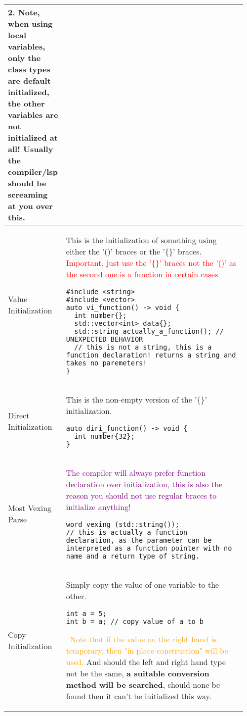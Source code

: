 \documentclass[main.tex,fontsize=8pt,paper=a4,paper=portrait,DIV=calc]{scrartcl}
\begin{document}
\begin{table}[ht!]
\begin{tabular}{|m{0.2\linewidth}|m{0.755\linewidth}|}
\textbf{2. Note, when using local variables, only the class types are default initialized, the other variables are not initialized at all! Usually the compiler/lsp should be screaming at you over this.}
\\
\hline
Value Initialization & 
This is the initialization of something using either the '()' braces or the '\{\}' braces.\newline
\textcolor{red}{Important, just use the '\{\}' braces not the '()' as the second one is a function in certain cases}
\begin{lstlisting}
#include <string>
#include <vector>
auto vi_function() -> void {
  int number{};
  std::vector<int> data{};
  std::string actually_a_function(); // UNEXPECTED BEHAVIOR
  // this is not a string, this is a function declaration! returns a string and takes no paremeters!
}
\end{lstlisting}
\\
\hline
Direct Initialization & 
This is the non-empty version of the '\{\}' initialization.\newline
\begin{lstlisting}
auto diri_function() -> void {
  int number{32};
}
\end{lstlisting}
\\
\hline
Most Vexing Parse & 
\textcolor{purple}{The compiler will always prefer function declaration over initialization, this is also the reason you should not use regular braces to initialize anything!}\newline
\begin{lstlisting}
word vexing (std::string());
// this is actually a function declaration, as the parameter can be interpreted as a function pointer with no name and a return type of string.
\end{lstlisting}
\\
\hline
Copy Initialization & 
Simply copy the value of one variable to the other.\newline
\begin{lstlisting}
int a = 5;
int b = a; // copy value of a to b
\end{lstlisting} 
\, \newline
\textcolor{orange}{Note that if the value on the right hand is temporary, then "in place construction" will be used.}\newline
And should the left and right hand type not be the same, \textbf{a suitable conversion method will be searched}, should none be found then it can't be initialized this way.
\\

\end{tabular}
\end{table}
\end{document}
